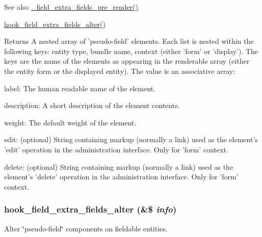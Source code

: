 \begin{DoxySeeAlso}{See also}
\hyperlink{group__field_gaf9008661a037c20fca58ad9738495325}{\_\-field\_\-extra\_\-fields\_\-pre\_\-render()} 

\hyperlink{group__hooks_ga88b06596d711f640ebe2f5d3566e7876}{hook\_\-field\_\-extra\_\-fields\_\-alter()}
\end{DoxySeeAlso}
\begin{DoxyReturn}{Returns}
A nested array of 'pseudo-\/field' elements. Each list is nested within the following keys: entity type, bundle name, context (either 'form' or 'display'). The keys are the name of the elements as appearing in the renderable array (either the entity form or the displayed entity). The value is an associative array:
\begin{DoxyItemize}
\item label: The human readable name of the element.
\item description: A short description of the element contents.
\item weight: The default weight of the element.
\item edit: (optional) String containing markup (normally a link) used as the element's 'edit' operation in the administration interface. Only for 'form' context.
\item delete: (optional) String containing markup (normally a link) used as the element's 'delete' operation in the administration interface. Only for 'form' context. 
\end{DoxyItemize}
\end{DoxyReturn}
\hypertarget{group__hooks_ga88b06596d711f640ebe2f5d3566e7876}{
\subsubsection[{hook\_\-field\_\-extra\_\-fields\_\-alter}]{\setlength{\rightskip}{0pt plus 5cm}hook\_\-field\_\-extra\_\-fields\_\-alter (\&\$ {\em info})}}
\label{group__hooks_ga88b06596d711f640ebe2f5d3566e7876}
Alter \char`\"{}pseudo-\/field\char`\"{} components on fieldable entities.


